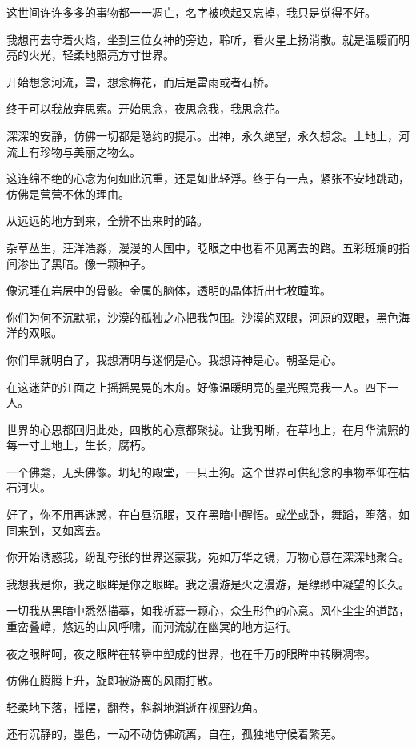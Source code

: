 \documentclass[UTF8]{article}
\begin{document}
\par 这世间许许多多的事物都一一凋亡，名字被唤起又忘掉，我只是觉得不好。
\par 我想再去守着火焰，坐到三位女神的旁边，聆听，看火星上扬消散。就是温暖而明亮的火光，轻柔地照亮方寸世界。
\par 开始想念河流，雪，想念梅花，而后是雷雨或者石桥。
\par 终于可以我放弃思索。开始思念，夜思念我，我思念花。
\par 深深的安静，仿佛一切都是隐约的提示。出神，永久绝望，永久想念。土地上，河流上有珍物与美丽之物么。
\par 这连绵不绝的心念为何如此沉重，还是如此轻浮。终于有一点，紧张不安地跳动，仿佛是营营不休的理由。
\par 从远远的地方到来，全辨不出来时的路。
\par 杂草丛生，汪洋浩淼，漫漫的人国中，眨眼之中也看不见离去的路。五彩斑斓的指间渗出了黑暗。像一颗种子。
\par 像沉睡在岩层中的骨骸。金属的脑体，透明的晶体折出七枚瞳眸。
\par 你们为何不沉默呢，沙漠的孤独之心把我包围。沙漠的双眼，河原的双眼，黑色海洋的双眼。
\par 你们早就明白了，我想清明与迷惘是心。我想诗神是心。朝圣是心。
\par 在这迷茫的江面之上摇摇晃晃的木舟。好像温暖明亮的星光照亮我一人。四下一人。
\par 世界的心思都回归此处，四散的心意都聚拢。让我明晰，在草地上，在月华流照的每一寸土地上，生长，腐朽。
\par 一个佛龛，无头佛像。坍圮的殿堂，一只土狗。这个世界可供纪念的事物奉仰在枯石河央。
\par 好了，你不用再迷惑，在白昼沉眠，又在黑暗中醒悟。或坐或卧，舞蹈，堕落，如同来到，又如离去。
\par 你开始诱惑我，纷乱夸张的世界迷蒙我，宛如万华之镜，万物心意在深深地聚合。
\par 我想我是你，我之眼眸是你之眼眸。我之漫游是火之漫游，是缥缈中凝望的长久。
\par 一切我从黑暗中悉然描摹，如我祈慕一颗心，众生形色的心意。风仆尘尘的道路，重峦叠嶂，悠远的山风呼啸，而河流就在幽冥的地方运行。
\par 夜之眼眸呵，夜之眼眸在转瞬中塑成的世界，也在千万的眼眸中转瞬凋零。
\\[0.6cm]
\par 仿佛在腾腾上升，旋即被游离的风雨打散。
\par 轻柔地下落，摇摆，翻卷，斜斜地消逝在视野边角。
\par 还有沉静的，墨色，一动不动仿佛疏离，自在，孤独地守候着繁芜。
\end{document}
